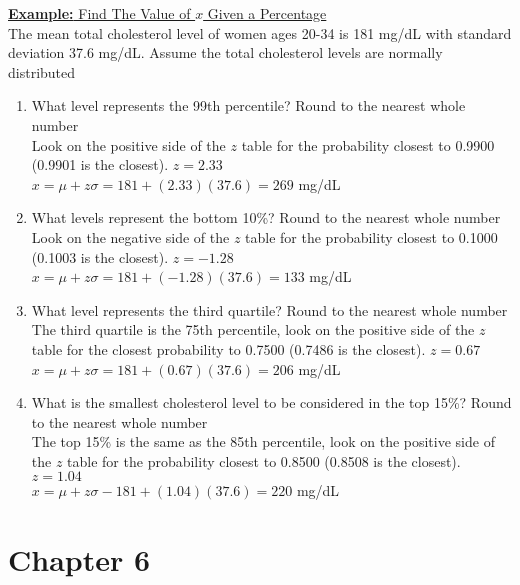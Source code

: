 \documentclass[a4paper]{article}
\let\bf\textbf
\begin{document}
\begin{shaded}
    \underline{\bf{Example:} Find The Value of $x$ Given a Percentage}
    \vspace{2mm}\\
    The mean total cholesterol level of women ages 20-34 is 181 mg/dL with standard deviation 37.6 mg/dL. Assume the total cholesterol levels are normally distributed
    \begin{enumerate}
        \item What level represents the 99th percentile? Round to the nearest whole number
        \vspace{1mm}\\
        Look on the positive side of the $z$ table for the probability closest to 0.9900 (0.9901 is the closest). $z = 2.33$\\
        $x = \mu + z\sigma = 181 + (2.33)(37.6) = 269$ mg/dL
        \item What levels represent the bottom 10\%? Round to the nearest whole number
        \vspace{1mm}\\
        Look on the negative side of the $z$ table for the probability closest to 0.1000 (0.1003 is the closest). $z = -1.28$\\
        $x = \mu + z\sigma = 181 + (-1.28)(37.6) = 133$ mg/dL
        \item What level represents the third quartile? Round to the nearest whole number
        \vspace{1mm}\\
        The third quartile is the 75th percentile, look on the positive side of the $z$ table for the closest probability to 0.7500 (0.7486 is the closest). $z = 0.67$\\
        $x = \mu + z\sigma = 181 + (0.67)(37.6) = 206$ mg/dL
        \item What is the smallest cholesterol level to be considered in the top 15\%? Round to the nearest whole number
        \vspace{1mm}\\
        The top 15\% is the same as the 85th percentile, look on the positive side of the $z$ table for the probability closest to 0.8500 (0.8508 is the closest). $z = 1.04$\\
        $x = \mu + z\sigma - 181 + (1.04)(37.6) = 220$ mg/dL
    \end{enumerate}
\end{shaded}
\newpage

\section{Chapter 6}
\end{document}
